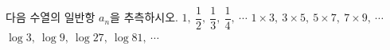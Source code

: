 다음 수열의 일반항 $a_n$을 추측하시오.
 $1,\ \dfrac{1}{2},\ \dfrac{1}{3},\ \dfrac{1}{4},\ \cdots$
 $1\times3,\ 3\times5,\ 5\times7,\ 7\times9,\ \cdots$
 $\log 3,\ \log 9,\ \log 27,\ \log 81,\ \cdots$
